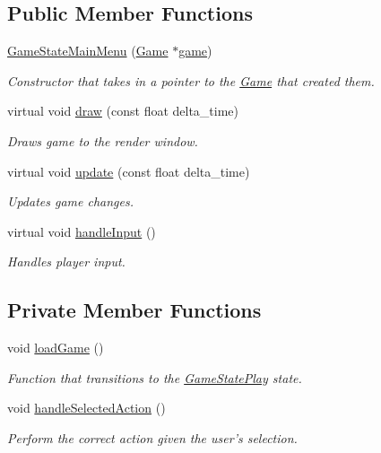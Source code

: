 \subsection*{Public Member Functions}
\begin{DoxyCompactItemize}
\item 
\hyperlink{class_game_state_main_menu_a7d7b3f28e70701ec9af22098b4220ec1}{Game\+State\+Main\+Menu} (\hyperlink{class_game}{Game} $\ast$\hyperlink{class_game_state_a355a79415b9ef63c2aec1448a99f6e71}{game})
\begin{DoxyCompactList}\small\item\em Constructor that takes in a pointer to the \hyperlink{class_game}{Game} that created them. \end{DoxyCompactList}\item 
virtual void \hyperlink{class_game_state_main_menu_ad34efc1ade7193ce765d00ac60f019ed}{draw} (const float delta\+\_\+time)
\begin{DoxyCompactList}\small\item\em Draws game to the render window. \end{DoxyCompactList}\item 
virtual void \hyperlink{class_game_state_main_menu_a15b2abc99f50183569112f7fe1499951}{update} (const float delta\+\_\+time)
\begin{DoxyCompactList}\small\item\em Updates game changes. \end{DoxyCompactList}\item 
virtual void \hyperlink{class_game_state_main_menu_a91ca3c60e107d135ab67c5f9e05e8aa6}{handle\+Input} ()
\begin{DoxyCompactList}\small\item\em Handles player input. \end{DoxyCompactList}\end{DoxyCompactItemize}
\subsection*{Private Member Functions}
\begin{DoxyCompactItemize}
\item 
void \hyperlink{class_game_state_main_menu_a76d18652314696ffa6369713ef5be3ed}{load\+Game} ()
\begin{DoxyCompactList}\small\item\em Function that transitions to the \hyperlink{class_game_state_play}{Game\+State\+Play} state. \end{DoxyCompactList}\item 
void \hyperlink{class_game_state_main_menu_a85d646b336e1bb6372d851f4f654e6f1}{handle\+Selected\+Action} ()
\begin{DoxyCompactList}\small\item\em Perform the correct action given the user's selection. \end{DoxyCompactList}\end{DoxyCompactItemize}
